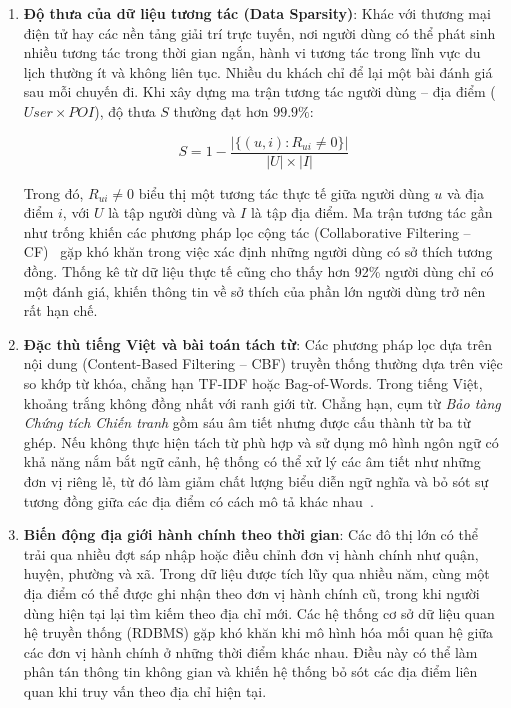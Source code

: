 \documentclass[journal,onecolumn,10pt]{IEEEtran}
\begin{document}
\begin{enumerate}
    \item \textbf{Độ thưa của dữ liệu tương tác (Data Sparsity)}: Khác với thương mại điện tử hay các nền tảng giải trí trực tuyến, nơi người dùng có thể phát sinh nhiều tương tác trong thời gian ngắn, hành vi tương tác trong lĩnh vực du lịch thường ít và không liên tục. Nhiều du khách chỉ để lại một bài đánh giá sau mỗi chuyến đi. Khi xây dựng ma trận tương tác người dùng -- địa điểm ($User \times POI$), độ thưa $S$ thường đạt hơn $99.9\%$:
    
    \begin{equation}
    S = 1 - \frac{|\{(u,i): R_{ui} \neq 0\}|}{|U| \times |I|}
    \end{equation}
    
    Trong đó, $R_{ui} \neq 0$ biểu thị một tương tác thực tế giữa người dùng $u$ và địa điểm $i$, với $U$ là tập người dùng và $I$ là tập địa điểm. Ma trận tương tác gần như trống khiến các phương pháp lọc cộng tác (Collaborative Filtering -- CF)~\cite{r5} gặp khó khăn trong việc xác định những người dùng có sở thích tương đồng. Thống kê từ dữ liệu thực tế cũng cho thấy hơn 92\% người dùng chỉ có một đánh giá, khiến thông tin về sở thích của phần lớn người dùng trở nên rất hạn chế.

    \item \textbf{Đặc thù tiếng Việt và bài toán tách từ}: Các phương pháp lọc dựa trên nội dung (Content-Based Filtering -- CBF) truyền thống thường dựa trên việc so khớp từ khóa, chẳng hạn TF-IDF hoặc Bag-of-Words. Trong tiếng Việt, khoảng trắng không đồng nhất với ranh giới từ. Chẳng hạn, cụm từ \textit{Bảo tàng Chứng tích Chiến tranh} gồm sáu âm tiết nhưng được cấu thành từ ba từ ghép. Nếu không thực hiện tách từ phù hợp và sử dụng mô hình ngôn ngữ có khả năng nắm bắt ngữ cảnh, hệ thống có thể xử lý các âm tiết như những đơn vị riêng lẻ, từ đó làm giảm chất lượng biểu diễn ngữ nghĩa và bỏ sót sự tương đồng giữa các địa điểm có cách mô tả khác nhau~\cite{r6, r7}.

    \item \textbf{Biến động địa giới hành chính theo thời gian}: Các đô thị lớn có thể trải qua nhiều đợt sáp nhập hoặc điều chỉnh đơn vị hành chính như quận, huyện, phường và xã. Trong dữ liệu được tích lũy qua nhiều năm, cùng một địa điểm có thể được ghi nhận theo đơn vị hành chính cũ, trong khi người dùng hiện tại lại tìm kiếm theo địa chỉ mới. Các hệ thống cơ sở dữ liệu quan hệ truyền thống (RDBMS) gặp khó khăn khi mô hình hóa mối quan hệ giữa các đơn vị hành chính ở những thời điểm khác nhau. Điều này có thể làm phân tán thông tin không gian và khiến hệ thống bỏ sót các địa điểm liên quan khi truy vấn theo địa chỉ hiện tại.


\end{enumerate}
\end{document}
